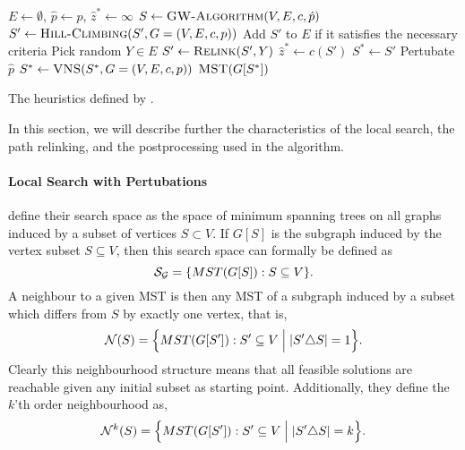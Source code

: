  \begin{algorithm}[h!]
   \begin{algorithmic}[1]
     \State $E \gets \emptyset$, $\hat{p} \gets p$, $\hat{z}^* \gets \infty$
     \State $S \gets \Call{GW-Algorithm}{V,E, c, \hat{p}}$ \label{alg:canuto:line:gw}
     \State $S' \gets \Call{Hill-Climbing}{S', G = (V, E, c, p)}$ \label{alg:canuto:line:hc}
     \State Add $S'$ to $E$ if it satisfies the necessary criteria \label{alg:canuto:line:elite}
     \State Pick random $Y \in E$
     \State $S' \gets \Call{Relink}{S', Y}$ \label{alg:canuto:line:relink}
     \State $\hat{z}^* \gets c(S')$
     \State $S^* \gets S'$
     \EndIf
     \EndIf
     \State Pertubate $\hat{p}$
     \EndFor
     \State $S^* \gets \Call{VNS}{S^*, G = (V, E, c, p)}$\label{alg:canuto:line:vns}
     \State \Return $\Call{MST}{G[S^*]}$
     \EndProcedure
 \end{algorithmic}
 \caption{The heuristics defined by \citet{canuto2001local}.}\label{alg:heuristics:canuto}
 \end{algorithm}

 In this section, we will
 describe further the characteristics of the local search, the
 path relinking, and the postprocessing used in the algorithm.
\paragraph{Local Search with Pertubations}
\citet{canuto2001local} define their search space as the space of minimum spanning
trees on all graphs induced by a subset of vertices
 $S \subset V$. If $G[S]$ is the subgraph induced by the vertex subset $S \subseteq V$, then
 this search space can formally be defined as
$$\mathcal{S_G} = \{MST(G[S]) : S \subseteq V \}\mathnormal{.}$$
A neighbour to a given MST is then any MST of a subgraph induced by a subset which differs from $S$
 by exactly one vertex, that is,
$$\mathcal{N}(S) = \Big\{MST(G[S']) : S' \subseteq V \Bigm| |S' \triangle S| = 1 \Big\}\mathnormal{.}$$ 
Clearly this neighbourhood structure means that all feasible solutions are reachable
given any initial subset as starting point. Additionally, they define the
$k$'th order neighbourhood as,
$$\mathcal{N}^k(S) = \Big\{MST(G[S']) : S' \subseteq V \Bigm| |S' \triangle S| = k \Big\}\mathnormal{.}$$ 

